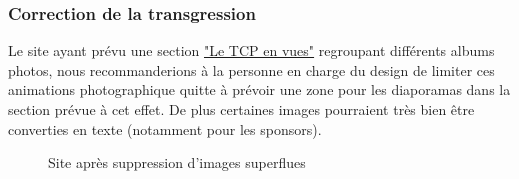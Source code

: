 \documentclass{article}[12pt]
\begin{document}
    	    \subsubsection*{Correction de la transgression}
	    	    Le site ayant prévu une section  \href{http://www.tennisclubdeparis.fr/album-photo.html}{"Le TCP en vues"} regroupant différents albums photos, nous recommanderions à la personne en charge du design de limiter ces animations photographique quitte à prévoir une zone pour les diaporamas dans la section prévue à cet effet. De plus certaines images pourraient très bien être converties en texte (notamment pour les sponsors).
                \begin{figure}[H]
   	\centering  {}
   	\caption{Site après suppression d'images superflues}
   \end{figure}
\end{document}
